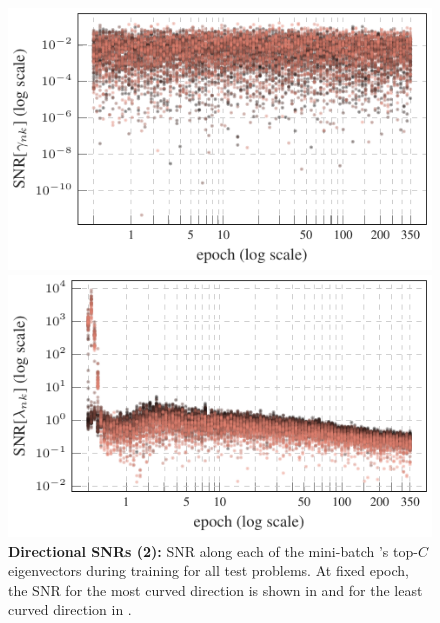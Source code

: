 \begin{figure}[p]
\textbf{\cifarhun \allcnnc \adam}\\[1mm]
\begin{minipage}{0.50\textwidth}
\centering
\includegraphics[width=\linewidth]{fig/exp13_plots/gammas_lambdas/cifar100_allcnnc_adam_gammas.pdf}
\end{minipage}\hfill
\begin{minipage}{0.50\textwidth}
\centering
\includegraphics[width=\linewidth]{fig/exp13_plots/gammas_lambdas/cifar100_allcnnc_adam_lambdas.pdf}
\end{minipage}

\caption{\textbf{Directional SNRs (2):}
SNR along each of the mini-batch \ggn{}'s top-$C$ eigenvectors during training for all test problems.
At fixed epoch, the SNR for the most curved direction is shown in
{\protect{}}
and for the least curved direction in
{\protect{}}.
}
\label{fig:directional_derivatives_2}
\end{figure}

